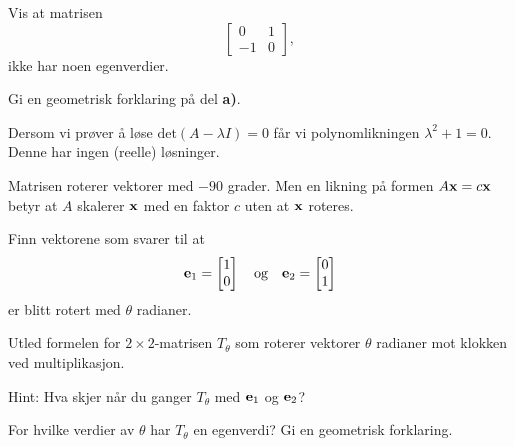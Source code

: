 \begin{oppgave}

\begin{punkt}
Vis at matrisen
\[
\begin{bmatrix}
 0 & 1\\
-1 & 0
\end{bmatrix},
\]
ikke har noen egenverdier.
\end{punkt}

\begin{punkt}
Gi en geometrisk forklaring på del \textbf{a)}.
\end{punkt}

\end{oppgave}


\begin{losning}

\begin{punkt}
Dersom vi prøver å løse $\text{det}(A-\lambda I)=0$ får vi polynomlikningen $\lambda^2+1=0$. Denne har ingen (reelle) løsninger.
\end{punkt}

\begin{punkt}
Matrisen roterer vektorer med $-90$ grader. Men en likning på formen $A\mathbf{x}=c\mathbf{x}$ betyr at $A$ skalerer $\mathbf{x}$ med en faktor $c$ uten at $\mathbf{x}$ roteres.
\end{punkt}

\end{losning}



\begin{oppgave}

\begin{punkt}
Finn vektorene som svarer til at $$\mathbf{e}_1 = \begin{bmatrix} 1 \\ 0 \end{bmatrix}\quad \text{og}\quad\mathbf{e}_2= \begin{bmatrix} 0 \\ 1 \end{bmatrix}$$ er blitt rotert med $\theta$ radianer.
\end{punkt}

\begin{punkt}
Utled formelen for $2 \times 2$-matrisen $T_\theta$ som roterer vektorer $\theta$ radianer mot klokken ved multiplikasjon.

\noindent
Hint: Hva skjer når du ganger $T_\theta$ med $\mathbf{e}_1$ og $\mathbf{e}_2$?
\end{punkt}

\begin{punkt}
For hvilke verdier av $\theta$ har $T_\theta$ en egenverdi? Gi en geometrisk forklaring.
\end{punkt}


\end{oppgave}


